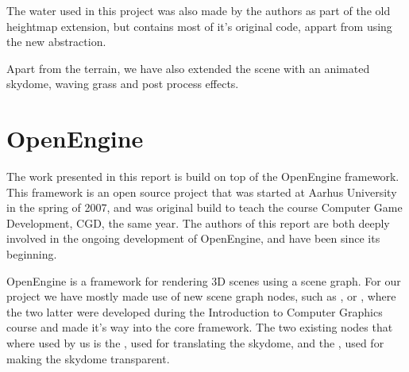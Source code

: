 The water used in this project was also made by the authors as part of
the old heightmap extension, but contains most of it's original code,
appart from using the new  abstraction.

Apart from the terrain, we have also extended the scene with an
animated skydome, waving grass and post process effects.



\section{OpenEngine}
The work presented in this report is build on top of the OpenEngine
framework. This framework is an open source project that was started
at Aarhus University in the spring of 2007, and was original build to
teach the course Computer Game Development, CGD, the same year. The
authors of this report are both deeply involved in the ongoing
development of OpenEngine, and have been since its beginning.

OpenEngine is a framework for rendering 3D scenes using a scene graph.
For our project we have mostly made use of new scene graph nodes, such
as ,  or ,
where the two latter were developed during the Introduction to
Computer Graphics course and made it's way into the core
framework. The two existing nodes that where used by us is the
, used for translating the skydome, and the
, used for making the skydome transparent.\\

